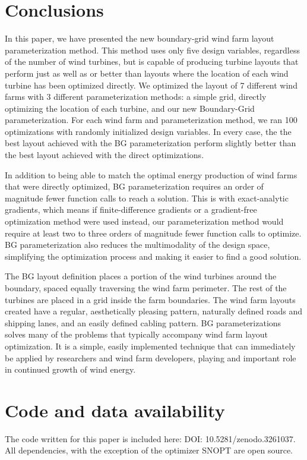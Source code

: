 \documentclass[wes, manuscript]{copernicus}
\begin{document}
\section{Conclusions}
In this paper, we have presented the new boundary-grid wind farm layout parameterization method. This method uses only five design variables, regardless of the number of wind turbines, but is capable of producing turbine layouts that perform just as well as or better than layouts where the location of each wind turbine has been optimized directly. We optimized the layout of 7 different wind farms with 3 different parameterization methods: a simple grid, directly optimizing the location of each turbine, and our new Boundary-Grid parameterization. For each wind farm and parameterization method, we ran 100 optimizations with randomly initialized design variables. In every case, the the best layout achieved with the BG parameterization perform slightly better than the best layout achieved with the direct optimizations.


In addition to being able to match the optimal energy production of wind farms that were directly optimized, BG parameterization requires an order of magnitude fewer function calls to reach a solution. This is with exact-analytic gradients, which means if finite-difference gradients or a gradient-free optimization method were used instead, our parameterization method would require at least two to three orders of magnitude fewer function calls to optimize.
%
BG parameterization also reduces the multimodality of the design space, simplifying the optimization process and making it easier to find a good solution.

The BG layout definition places a portion of the wind turbines around the boundary, spaced equally traversing the wind farm perimeter. The rest of the turbines are placed in a grid inside the farm boundaries. The wind farm layouts created have a regular, aesthetically pleasing pattern, naturally defined roads and shipping lanes, and an easily defined cabling pattern. 
%
BG parameterizations solves many of the problems that typically accompany wind farm layout optimization. It is a simple, easily implemented technique that can immediately be applied by researchers and wind farm developers, playing and important role in continued growth of wind energy.

\section*{Code and data availability}
The code written for this paper is included here: DOI: 10.5281/zenodo.3261037. All dependencies, with the exception of the optimizer SNOPT are open source.
\end{document}
